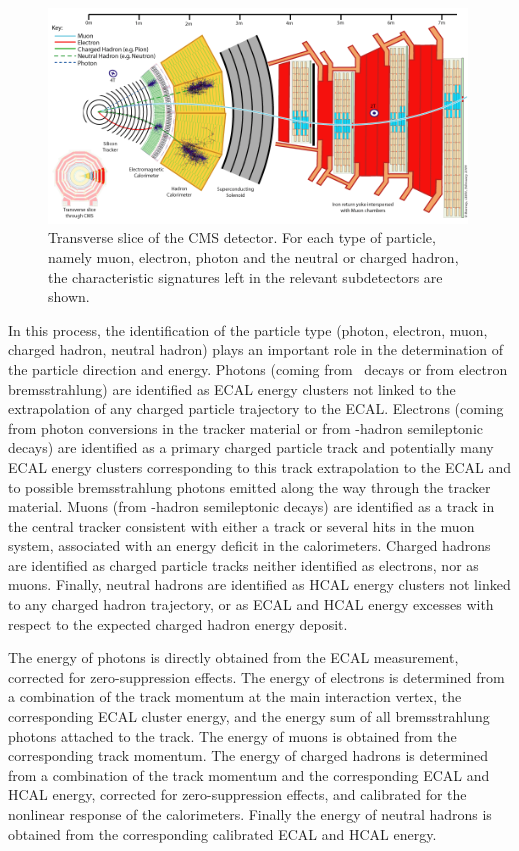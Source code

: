\begin{figure}[htbp]
\centering
\includegraphics[width=0.99\textwidth]{plots/intro/CMS_Slice.png}
\caption{Transverse slice of the CMS detector. For each type of particle, namely muon, electron,
 photon and the neutral or charged hadron, the characteristic
signatures left in the relevant subdetectors are shown. \label{fig:cmsslice}}
\end{figure}
 
In this process, the identification of the particle type (photon, electron, muon, charged hadron, neutral hadron) plays an important role in the determination of the particle direction and energy. Photons (\eg coming from \Pgpz\ decays or from electron bremsstrahlung) are identified as ECAL energy clusters not linked to the extrapolation of any charged particle trajectory to the ECAL. Electrons (\eg coming from photon conversions in the tracker material or from \cPqb-hadron semileptonic decays) are identified as a primary charged particle track and potentially many ECAL energy clusters corresponding to this track extrapolation to the ECAL and to possible bremsstrahlung photons emitted along the way through the tracker material. Muons (\eg from \cPqb-hadron semileptonic decays) are identified as a track in the central tracker consistent with either a track or several hits in the muon system, associated with an energy deficit in the calorimeters. Charged hadrons are identified as charged particle tracks neither identified as electrons, nor as muons. Finally, neutral hadrons are identified as HCAL energy clusters not linked to any charged hadron trajectory, or as ECAL and HCAL energy excesses with respect to the expected charged hadron energy deposit. 

The energy of photons is directly obtained from the ECAL measurement, corrected for zero-suppression effects. The energy of electrons is determined from a combination of the track momentum at the main interaction vertex, the corresponding ECAL cluster energy, and the energy sum of all bremsstrahlung photons attached to the track. The energy of muons is obtained from the corresponding track momentum. The energy of charged hadrons is determined from a combination of the track momentum and the corresponding ECAL and HCAL energy, corrected for zero-suppression effects, and calibrated for the nonlinear response of the calorimeters. Finally the energy of neutral hadrons is obtained from the corresponding calibrated ECAL and HCAL energy. 

